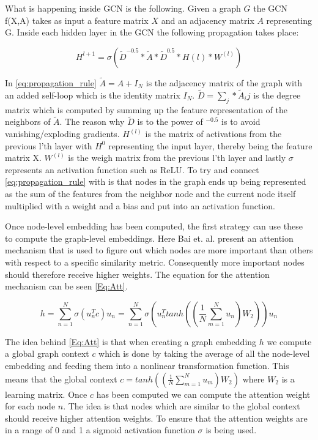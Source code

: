 What is happening inside GCN is the following. Given a graph $G$ the GCN f(X,A) takes as input a feature matrix $X$ and an adjacency matrix $A$ representing G. Inside each hidden layer in the GCN the following propagation takes place\cite{Kipf2016}:


\begin{equation}
\label{eq:propagation_rule}
H^{l+1} = \sigma (\tilde{D}^{-0.5}*\tilde{A}*\tilde{D}^{0.5}*H{(l)} * W^{(l)})
\end{equation}

In \autoref{eq:propagation_rule} $\tilde{A} = A +I_N$ is the adjacency matrix of the graph with an added self-loop which is the identity matrix $I_N$. $\tilde{D} = \sum_j * \tilde{A}_ij$ is the degree matrix which is computed by summing up the feature representation of the neighbors of $\tilde{A}$. The reason why $\tilde{D}$ is to the power of $^{-0.5}$ is to avoid vanishing/exploding gradients. $H^{(l)}$ is the matrix of activations from the previous l'th layer with $H^0$ representing the input layer, thereby being the feature matrix X. $W^{(l)}$ is the weigh matrix from the previous l'th layer and lastly $\sigma$ represents an activation function such as ReLU\cite{Kipf2016}. To try and connect \autoref{eq:propagation_rule} with  is that nodes in the graph ends up being represented as the sum of the features from the neighbor node and the current node itself multiplied with a weight and a bias and put into an activation function.


Once node-level embedding has been computed, the first strategy can use these to compute the graph-level embeddings. Here Bai et. al. present an attention mechanism that is used to figure out which nodes are more important than others with respect to a specific similarity metric. Consequently more important nodes should therefore receive higher weights\cite{Bai2018}. The equation for the attention mechanism can be seen \autoref{Eq:Att}.



\begin{equation}\label{Eq:Att}
h= \sum^N_{n=1} \sigma(u^T_nc)u_n=\sum^N_{n=1}\sigma(u^T_ntanh((\frac{1}{N}\sum_{m=1}^Nu_n)W_2))u_n
\end{equation}

The idea behind \autoref{Eq:Att} is that when creating a graph embedding $h$ we compute a global graph context $c$ which is done by taking the average of all the node-level embedding and feeding them into a nonlinear transformation function. This means that the global context $c=tanh((\frac{1}{N}\sum_{m=1}^Nu_m)W_2)$ where $W_2$ is a learning matrix. Once $c$ has been computed we can compute the attention weight for each node $n$. The idea is that nodes which are similar to the global context should receive higher attention weights. To ensure that the attention weights are in a range of 0 and 1 a sigmoid activation function $\sigma$ is being used\cite{Bai2018}.


